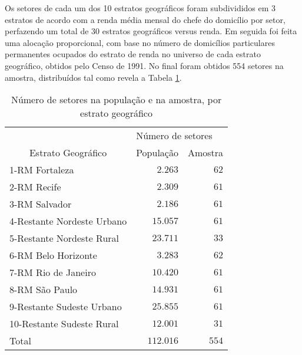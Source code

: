 \documentclass[]{book}
\numberwithin{example}{chapter}
\numberwithin{remark}{chapter}
\numberwithin{definition}{chapter}
\begin{document}
Os setores de cada um dos 10 estratos geográficos foram subdivididos em
3 estratos de acordo com a renda média mensal do chefe do domicílio por
setor, perfazendo um total de 30 estratos geográficos versus renda. Em
seguida foi feita uma alocação proporcional, com base no número de
domicílios particulares permanentes ocupados do estrato de renda no
universo de cada estrato geográfico, obtidos pelo Censo de 1991. No
final foram obtidos 554 setores na amostra, distribuídos tal como revela
a Tabela \ref{table:Tab11}.

\begin{center}
\begin{table}[htbp] \centering

\caption{Número de setores na população e na amostra, por estrato geográfico}
\bigskip \label{table:Tab11}
\begin{tabular}{|l|c|c|}
\hline\hline
& \multicolumn{2}{|l|}{Número de setores} \\ \cline{2-3}
\multicolumn{1}{|c|}{Estrato Geográfico} & População & Amostra
\\ \hline\hline
1-RM Fortaleza & \multicolumn{1}{|r|}{$2.263$} & \multicolumn{1}{|r|}{$62$}
\\ \hline
2-RM Recife & \multicolumn{1}{|r|}{$2.309$} & \multicolumn{1}{|r|}{$61$} \\
\hline
3-RM Salvador & \multicolumn{1}{|r|}{$2.186$} & \multicolumn{1}{|r|}{$61$}
\\ \hline
4-Restante Nordeste Urbano & \multicolumn{1}{|r|}{$15.057$} &
\multicolumn{1}{|r|}{$61$} \\ \hline
5-Restante Nordeste Rural & \multicolumn{1}{|r|}{$23.711$} &
\multicolumn{1}{|r|}{$33$} \\ \hline
6-RM Belo Horizonte & \multicolumn{1}{|r|}{$3.283$} & \multicolumn{1}{|r|}{$%
62$} \\ \hline
7-RM Rio de Janeiro & \multicolumn{1}{|r|}{$10.420$} & \multicolumn{1}{|r|}{$%
61$} \\ \hline
8-RM São Paulo & \multicolumn{1}{|r|}{$14.931$} & \multicolumn{1}{|r|}{$%
61$} \\ \hline
9-Restante Sudeste Urbano & \multicolumn{1}{|r|}{$25.855$} &
\multicolumn{1}{|r|}{$61$} \\ \hline
10-Restante Sudeste Rural & \multicolumn{1}{|r|}{$12.001$} &
\multicolumn{1}{|r|}{$31$} \\ \hline\hline
Total & \multicolumn{1}{|r|}{$112.016$} & \multicolumn{1}{|r|}{$554$} \\
\hline\hline
\end{tabular}
\end{table}
\end{center}
\end{document}

